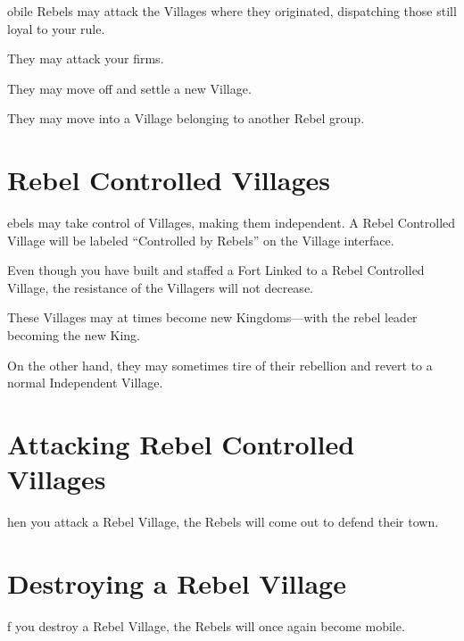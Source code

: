 obile Rebels may attack the Villages where they originated, dispatching those still loyal to your rule.

They may attack your firms.

They may move off and settle a new Village.

They may move into a Village belonging to another Rebel group.

\section{Rebel Controlled Villages}

ebels may take control of Villages, making them independent. A Rebel Controlled Village will be labeled “Controlled by Rebels” on the Village interface.

Even though you have built and staffed a Fort Linked to a Rebel Controlled Village, the resistance of the Villagers will not decrease.

These Villages may at times become new Kingdoms---with the rebel leader becoming the new King.

On the other hand, they may sometimes tire of their rebellion and revert to a normal Independent Village.

\section{Attacking Rebel Controlled Villages}


hen you attack a Rebel Village, the Rebels will come out to defend their town.

\section{Destroying a Rebel Village}


f you destroy a Rebel Village, the Rebels will once again become mobile.